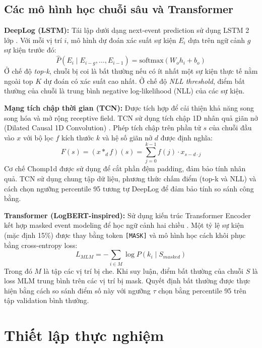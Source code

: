 \documentclass[conference]{IEEEtran}
\begin{document}
\subsection{Các mô hình học chuỗi sâu và Transformer}
\textbf{DeepLog (LSTM):} Tái lập dưới dạng next-event prediction sử dụng LSTM 2 lớp \cite{b1}. Với mỗi vị trí $i$, mô hình dự đoán xác suất sự kiện $E_i$ dựa trên ngữ cảnh $g$ sự kiện trước đó:
\begin{equation}
\hat{P}(E_i \mid E_{i-g}, \ldots, E_{i-1}) = \text{softmax}(W_o h_i + b_o)
\end{equation}
Ở chế độ \emph{top-k}, chuỗi bị coi là bất thường nếu có ít nhất một sự kiện thực tế nằm ngoài top $K$ dự đoán có xác suất cao nhất. Ở chế độ \emph{NLL threshold}, điểm bất thường của chuỗi là trung bình negative log-likelihood (NLL) của các sự kiện.

\textbf{Mạng tích chập thời gian (TCN):} Được tích hợp để cải thiện khả năng song song hóa và mở rộng receptive field. TCN sử dụng tích chập 1D nhân quả giãn nở (Dilated Causal 1D Convolution) \cite{b19}. Phép tích chập trên phần tử $s$ của chuỗi đầu vào $x$ với bộ lọc $f$ kích thước $k$ và hệ số giãn nở $d$ được định nghĩa:
\begin{equation}
F(s) = (x *_d f)(s) = \sum_{j=0}^{k-1} f(j) \cdot x_{s - d \cdot j}
\end{equation}
Cơ chế Chomp1d được sử dụng để cắt phần đệm padding, đảm bảo tính nhân quả. TCN sử dụng chung tập dữ liệu, phương thức chấm điểm (top-k và NLL) và cách chọn ngưỡng percentile 95 tương tự DeepLog để đảm bảo tính so sánh công bằng.

\textbf{Transformer (LogBERT-inspired):} Sử dụng kiến trúc Transformer Encoder kết hợp masked event modeling để học ngữ cảnh hai chiều \cite{b2}. Một tỷ lệ sự kiện (mặc định 15\%) được thay bằng token \texttt{[MASK]} và mô hình học cách khôi phục bằng cross-entropy loss:
\begin{equation}
L_{MLM} = -\sum_{i \in M} \log P(k_i \mid S_{masked})
\label{eq_loss}
\end{equation}
Trong đó $M$ là tập các vị trí bị che. Khi suy luận, điểm bất thường của chuỗi $S$ là loss MLM trung bình trên các vị trí bị mask. Quyết định bất thường được thực hiện bằng cách so sánh điểm số này với ngưỡng $\tau$ chọn bằng percentile 95 trên tập validation bình thường.


\section{Thiết lập thực nghiệm}
\end{document}
